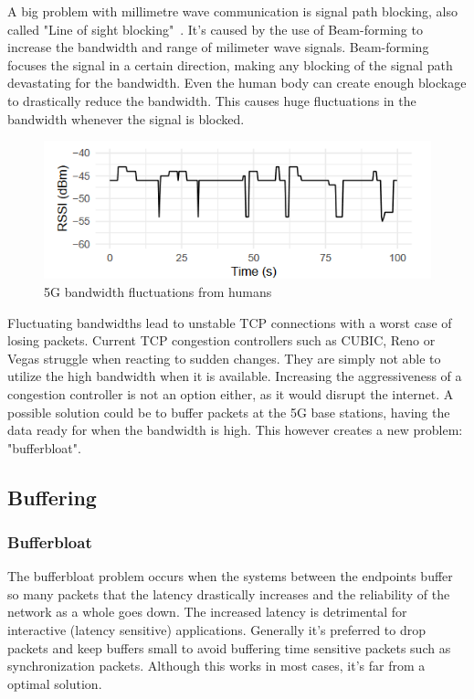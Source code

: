 \documentclass[a4paper,english, 11pt]{report}
\begin{document}
A big problem with millimetre wave communication is signal path blocking, also called "Line of sight blocking"~\cite{mmwave_blocking}. It's caused by the use of Beam-forming to increase the bandwidth and range of milimeter wave signals. Beam-forming focuses the signal in a certain direction, making any blocking of the signal path devastating for the bandwidth. Even the human body can create enough blockage to drastically reduce the bandwidth. This causes huge fluctuations in the bandwidth whenever the signal is blocked.\\
\begin{figure} %
	\centering
	\includegraphics[scale=1.25]{../diagrams/graphs/tcp_mmwave_blockage.png}
  	\caption{5G bandwidth fluctuations from humans}
  	\label{fig:blockage}
\end{figure}

Fluctuating bandwidths lead to unstable TCP connections with a worst case of losing packets. Current TCP congestion controllers such as CUBIC, Reno or Vegas struggle when reacting to sudden changes.\cite{bandwidth_changes} They are simply not able to utilize the high bandwidth when it is available. Increasing the aggressiveness of a congestion controller is not an option either, as it would disrupt the internet. A possible solution could be to buffer packets at the 5G base stations, having the data ready for when the bandwidth is high. This however creates a new problem: "bufferbloat".


\subsection{Buffering}
\subsubsection{Bufferbloat}
The bufferbloat problem occurs when the systems between the endpoints buffer so many packets that the latency drastically increases and the reliability of the network as a whole goes down. The increased latency is detrimental for interactive (latency sensitive) applications. Generally it's preferred to drop packets and keep buffers small to avoid buffering time sensitive packets such as synchronization packets. Although this works in most cases, it's far from a optimal solution.\\
\end{document}
